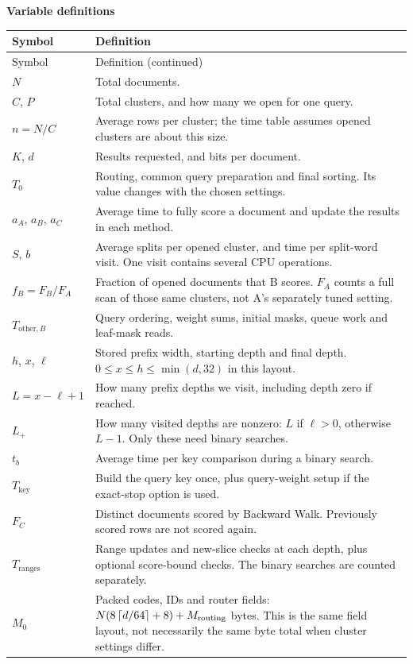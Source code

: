 \textbf{Variable definitions}
{\small
\begin{longtable}{@{}p{.22\linewidth}p{.74\linewidth}@{}}
\toprule Symbol & Definition\\\midrule
\endfirsthead
\toprule Symbol & Definition (continued)\\\midrule
\endhead
\bottomrule\endfoot
$N$ & Total documents.\\
$C$, $P$ & Total clusters, and how many we open for one query.\\
$n=N/C$ & Average rows per cluster; the time table assumes opened clusters are about this size.\\
$K$, $d$ & Results requested, and bits per document.\\
$T_0$ & Routing, common query preparation and final sorting. Its value changes with the chosen settings.\\
$a_A$, $a_B$, $a_C$ & Average time to fully score a document and update the results in each method.\\
$S$, $b$ & Average splits per opened cluster, and time per split-word visit. One visit contains several CPU operations.\\
$f_B=F_B/F_A$ & Fraction of opened documents that B scores. $F_A$ counts a full scan of those same clusters, not A's separately tuned setting.\\
$T_{\mathrm{other},B}$ & Query ordering, weight sums, initial masks, queue work and leaf-mask reads.\\
$h$, $x$, $\ell$ & Stored prefix width, starting depth and final depth. $0\le x\le h\le\min(d,32)$ in this layout.\\
$L=x-\ell+1$ & How many prefix depths we visit, including depth zero if reached.\\
$L_+$ & How many visited depths are nonzero: $L$ if $\ell>0$, otherwise $L-1$. Only these need binary searches.\\
$t_b$ & Average time per key comparison during a binary search.\\
$T_{\mathrm{key}}$ & Build the query key once, plus query-weight setup if the exact-stop option is used.\\
$F_C$ & Distinct documents scored by Backward Walk. Previously scored rows are not scored again.\\
$T_{\mathrm{ranges}}$ & Range updates and new-slice checks at each depth, plus optional score-bound checks. The binary searches are counted separately.\\
$M_0$ & Packed codes, IDs and router fields: $N(8\left\lceil d/64\right\rceil+8)+M_{\mathrm{routing}}$ bytes. This is the same field layout, not necessarily the same byte total when cluster settings differ.\\

\end{longtable}}

